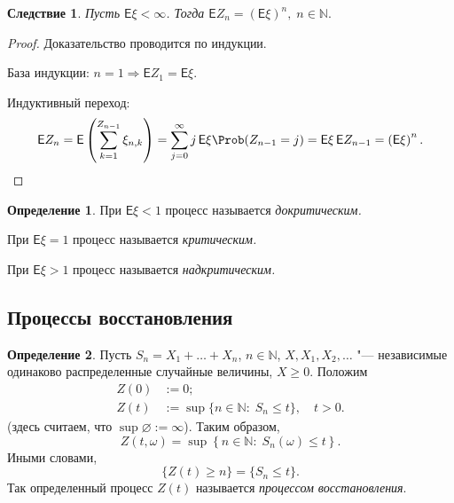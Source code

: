 \documentclass[a4paper]{article}
\newcommand{\Expect}{\mathsf{E}}
\theoremstyle{plain}
\newtheorem*{cor}{Следствие}
\theoremstyle{definition}
\newtheorem{defn}{Определение}[section]
\theoremstyle{remark}
\theoremstyle{nonumberplain}
\newtheorem{proof}{Доказательство}
\theoremstyle{nonumberplain}
\begin{document}
\begin{cor}
  Пусть $\Expect \xi < \infty$. Тогда $\Expect Z_{n} = (\Expect \xi)^{n},\; n \in \mathbb{N}{.}$
\end{cor}

\begin{proof}
  Доказательство проводится по индукции.

  База индукции: $n=1 \Rightarrow \Expect Z_{1} = \Expect \xi$.

  Индуктивный переход:
  \begin{equation*}
    \Expect Z_{n} = \Expect \left( \sum_{k=1}^{Z_{n-1}} \xi_{n,k} \right) = \sum\limits_{j=0}^{\infty} j \, \Expect \xi \Prob (Z_{n-1} = j) = \Expect \xi \, \Expect Z_{n-1} = \left(\Expect \xi \right)^{n}.
  \end{equation*}
\end{proof}

\begin{defn}\mbox{}

  При $\Expect \xi < 1$ процесс называется \emph{докритическим.}

  При $\Expect \xi = 1$ процесс называется \emph{критическим.}

  При $\Expect \xi > 1$ процесс называется \emph{надкритическим.}
\end{defn}

\subsection{Процессы восстановления}

\begin{defn}
  Пусть $S_{n} = X_{1} + \ldots + X_{n}$, $n \in \mathbb{N}$, $X, X_{1}, X_{2}, \ldots$ "--- независимые одинаково распределенные случайные величины, $X \geqslant 0$. Положим
  \begin{align*}
    Z(0) &:= 0;\\
    Z(t) &:= \sup \lbrace n \in \mathbb{N}:\; S_{n} \leqslant t \rbrace{,}\quad t > 0.
  \end{align*}
  (здесь считаем, что $\sup \varnothing := \infty$). Таким образом,
  \begin{equation*}
    Z(t, \omega) = \sup \left\lbrace n \in \mathbb{N}: \; S_{n}(\omega) \leqslant t \right\rbrace{.}
  \end{equation*}
  Иными словами,
  \begin{equation*}
    \lbrace Z(t) \geqslant n \rbrace = \lbrace S_{n} \leqslant t \rbrace{.}
  \end{equation*}
  Так определенный процесс $Z(t)$ называется \emph{процессом восстановления}.
\end{defn}
\end{document}
